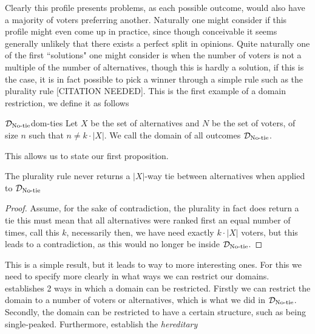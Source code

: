 Clearly this profile presents problems, as each possible outcome, would also have a majority of voters preferring another. Naturally one might consider if this profile might even come up in practice, since though conceivable it seems generally unlikely that there exists a perfect split in opinions. Quite naturally one of the first ``solutions" one might consider is when the number of voters is not a multiple of the number of alternatives, though this is hardly a solution, if this is the case, it is in fact possible to pick a winner through a simple rule such as the plurality rule [CITATION NEEDED]. This is the first example of a domain restriction, we define it as follows

\begin{definition}{$\mathcal{D}_{\text{No-tie}}$}{dom-ties}
	Let $X$ be the set of alternatives and $N$ be the set of voters, of size $n$ such that $n \neq k \cdot |X|$. We call the domain of all outcomes $\mathcal{D}_{\text{No-tie}}$.
\end{definition}

This allows us to state our first proposition.

\begin{proposition}
	The plurality rule never returns a $|X|$-way tie between alternatives when applied to $\mathcal{D}_{\text{No-tie}}$
\end{proposition}

\begin{proof}
	Assume, for the sake of contradiction, the plurality in fact does return a tie this must mean that all alternatives were ranked first an equal number of times, call this $k$, necessarily then, we have need exactly $k \cdot |X|$ voters, but this leads to a contradiction, as this would no longer be inside $\mathcal{D}_{\text{No-tie}}$.
\end{proof}

This is a simple result, but it leads to way to more interesting ones. For this we need to specify more clearly in what ways we can restrict our domains. \citet{gaertnerChapter3Domain2002} establishes 2 ways in which a domain can be restricted. Firstly we can restrict the domain to a number of voters or alternatives, which is what we did in $\mathcal{D}_{\text{No-tie}}$. Secondly, the domain can be restricted to have a certain structure, such as being single-peaked. Furthermore, \citet{elkindPreferenceRestrictionsComputational2022a} establish the \textit{hereditary}

